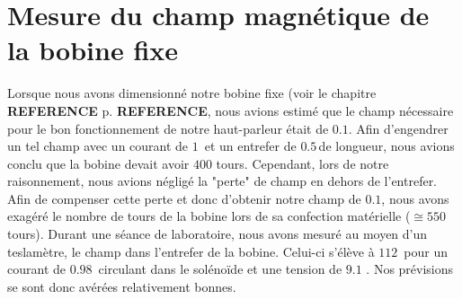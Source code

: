 \section{Mesure du champ magnétique de la bobine fixe}
\label{mesures champ}
Lorsque nous avons dimensionné notre bobine fixe (voir le chapitre \textbf{REFERENCE} p. \textbf{REFERENCE}, nous avions estimé que le champ nécessaire pour le bon fonctionnement de notre haut-parleur était de $0.1$\tesla.  Afin d'engendrer un tel champ avec un courant de $1$\ampere \, et un entrefer de $0.5$\centi\meter \,de longueur, nous avions conclu que la bobine devait avoir $400$ tours. Cependant, lors de notre raisonnement, nous avions négligé la "perte" de champ en dehors de l'entrefer. Afin de compenser cette perte et donc d'obtenir notre champ de $0.1$\tesla, nous avons exagéré le nombre de tours de la bobine lors de sa confection matérielle ($\cong 550$ tours). 
Durant une séance de laboratoire, nous avons mesuré au moyen d'un teslamètre, le champ dans l'entrefer de la bobine. Celui-ci s'élève à $112$\milli \tesla \, pour un courant de $0.98$ \ampere \,circulant dans le solénoïde et une tension de $9.1$ \volt. Nos prévisions se sont donc avérées relativement bonnes.


